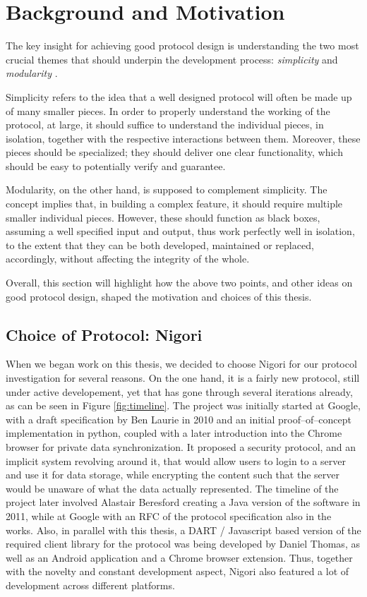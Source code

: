 \chapter{Background and Motivation} \label{chapter:background}
The key insight for achieving good protocol design is understanding the two most crucial themes that should underpin the development process: \textit{simplicity} and \textit{modularity} \cite{ProtocolDesign}.

Simplicity refers to the idea that a well designed protocol will often be made up of many smaller pieces.
In order to properly understand the working of the protocol, at large, it should suffice to understand the individual pieces, in isolation, together with the respective interactions between them.
Moreover, these pieces should be specialized; they should deliver one clear functionality, which should be easy to potentially verify and guarantee.

Modularity, on the other hand, is supposed to complement simplicity. The concept implies that, in building a complex feature, it should require multiple smaller individual pieces.
However, these should function as black boxes, assuming a well specified input and output, thus work perfectly well in isolation, to the extent that they can be both developed, maintained or replaced, accordingly, without affecting the integrity of the whole.

Overall, this section will highlight how the above two points, and other ideas on good protocol design, shaped the motivation and choices of this thesis.

\section{Choice of Protocol: Nigori}
When we began work on this thesis, we decided to choose Nigori for our protocol investigation for several reasons.
On the one hand, it is a fairly new protocol, still under active developement, yet that has gone through several iterations already, as can be seen in Figure \ref{fig:timeline}.
The project was initially started at Google, with a draft specification by Ben Laurie in 2010 \cite{NigoriDraft} and an initial proof--of--concept implementation in python, coupled with a later introduction into the Chrome browser for private data synchronization.
It proposed a security protocol, and an implicit system revolving around it, that would allow users to login to a server and use it for data storage, while encrypting the content such that the server would be unaware of what the data actually represented.
The timeline of the project later involved Alastair Beresford creating a Java version of the software in 2011, while at Google with an RFC \cite{NigoriRFC} of the protocol specification also in the works.
Also, in parallel with this thesis, a DART \cite{DART} / Javascript based version of the required client library for the protocol was being developed by Daniel Thomas, as well as an Android application and a Chrome browser extension.
Thus, together with the novelty and constant development aspect, Nigori also featured a lot of development across different platforms.

